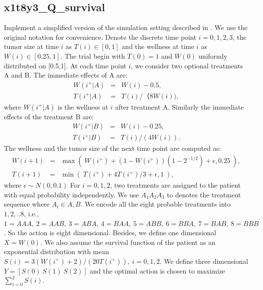 \documentclass[12pt]{article}
\begin{document}
\subsection*{x1t8y3\_Q\_survival}
Implement a simplified version of the simulation setting described in \cite{goldberg2012q}. We use the original notation for convenience. Denote the discrete time point $i=0,1,2,3$, the tumor size at time $i$ as $T(i) \in [0,1]$ and the wellness at time $i$ as $W(i)\in [0.25,1]$. The trial begin with $T(0)=1$ and $W(0)$ uniformly distributed on [0.5,1]. At each time point $i$, we consider two optional treatments A and B. The immediate effects of A are:
\begin{eqnarray}
W(i^+|A)&=&W(i)-0.5,\\
T(i^+|A)&=&T(i)/（8W(i)),
\end{eqnarray}
where $W(i^+|A)$ is the wellness at $i$ after treatment A. Similarly the immediate effects of the treatment B are:
\begin{eqnarray}
W(i^+|B)&=&W(i)-0.25,\\
T(i^+|B)&=&T(i)/(4W(i)).
\end{eqnarray}
The wellness and the tumor size of the next time point are computed as:
\begin{eqnarray}
W(i+1)&=&\max(~W(i^+)+(1-W(i^+))(1-2^{-1/2})+\epsilon,0.25~),\\
T(i+1)&=&\min(~T(i^+)+4T(i^+)/3+\epsilon,1~),
\end{eqnarray}
where $\epsilon \sim N(0,0.1)$
For $i=0,1,2$, two treatments are assigned to the patient with equal probability independently. We use $A_1A_2A_3$ to denotes the treatment sequence where $A_i\in {A,B}$. We encode all the eight probable treatments into $1,2,..8$, i.e., $1=AAA,~2=AAB,~3=ABA,~4=BAA,~5=ABB,~6=BBA,~7=BAB,~8=BBB$. So the action is eight dimensional. Besides, we define one dimensional $X=W(0)$. We also assume the survival function of the patient as an exponential distribution with mean $S(i)=3(W(i^+)+2)/(20T(i^+)),~ i=0,1,2$. We define three dimensional $Y=[S(0)~S(1)~S(2)]$ and the optimal action is chosen to maximize $\sum_{i=0}^2 S(i)$.
\end{document}
